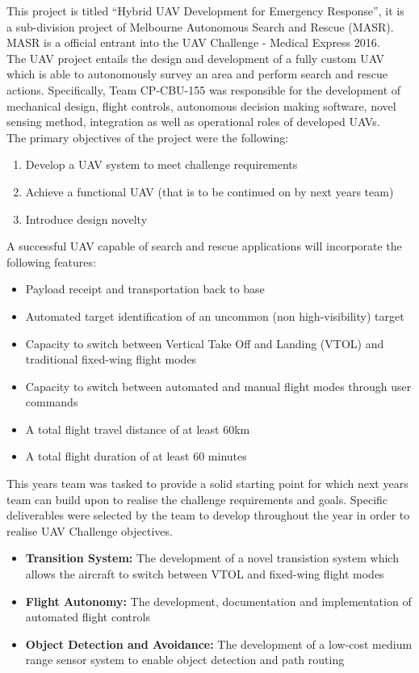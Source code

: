 This project is titled ``Hybrid UAV Development for Emergency Response'', it is a sub-division project of Melbourne Autonomous Search and Rescue (MASR). MASR is a official entrant into the UAV  Challenge - Medical Express 2016.\\

The UAV project entails the design and development of a fully custom UAV which is able to autonomously survey an area and perform search and rescue actions. Specifically, Team CP-CBU-155 was responsible for the development of mechanical design, flight controls, autonomous decision making software, novel sensing method, integration as well as operational roles of developed UAVs.\\

The primary objectives of the project were the following:

\begin{enumerate}
	\item Develop a UAV system to meet challenge requirements
	\item Achieve a functional UAV (that is to be continued on by next years team)
	\item Introduce design novelty \\
\end{enumerate}

A successful UAV capable of search and rescue applications will incorporate the following features:
\begin{itemize}
	\item Payload receipt and transportation back to base
	\item Automated target identification of an uncommon (non high-visibility) target
	\item Capacity to switch between Vertical Take Off and Landing (VTOL) and traditional fixed-wing flight modes
	\item Capacity to switch between automated and manual flight modes through user commands
	\item A total flight travel distance of at least 60km
	\item A total flight duration of at least 60 minutes\\
\end{itemize}

This years team was tasked to provide a solid starting point for which next years team can build upon to realise the challenge requirements and goals. Specific deliverables were selected by the team to develop throughout the year in order to realise UAV Challenge objectives.
\begin{itemize}
	\item \textbf{Transition System:} The development of a novel transistion system which allows the aircraft to switch between VTOL and fixed-wing flight modes
	\item \textbf{Flight Autonomy:} The development, documentation and implementation of automated flight controls
	\item \textbf{Object Detection and Avoidance:} The development of a low-cost medium range sensor system to enable object detection and path routing
\end{itemize}


